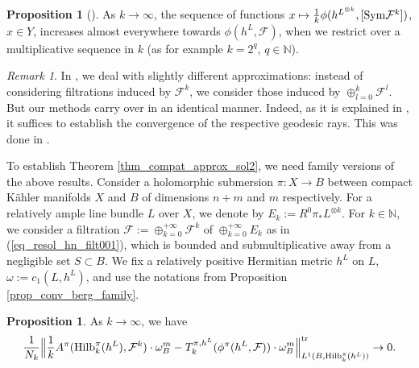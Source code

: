 \documentclass[12pt]{article}
\numberwithin{equation}{section}
\theoremstyle{theorem}
\theoremstyle{definition}
\newtheorem{prop}[thm]{Proposition}
\theoremstyle{remark}
\newtheorem{rem}[thm]{Remark}
\newcommand{\nat}{\mathbb{N}}
\begin{document}
	\begin{prop}[{\cite[(3.6)]{FinSubmToepl}}]\label{prop_incr_geod_rays}
		As $k \to \infty$, the sequence of functions $x \mapsto \frac{1}{k} \phi(h^{L^{\otimes k}}, [{\rm{Sym}} \mathcal{F}^k])$, $x \in Y$, increases almost everywhere towards $\phi(h^L, \mathcal{F})$, when we restrict over a multiplicative sequence in $k$ (as for example $k = 2^q$, $q \in \nat$).
	\end{prop}
	\begin{rem}
		In \cite{FinSubmToepl}, we deal with slightly different approximations: instead of considering filtrations induced by $\mathcal{F}^k$, we consider those induced by $\oplus_{l = 0}^{k} \mathcal{F}^l$.
		But our methods carry over in an identical manner.
		Indeed, as it is explained in \cite[(3.14)]{FinSubmToepl}, it suffices to establish the convergence of the respective geodesic rays.
		This was done in \cite[Theorem 5.10]{FinNarSim}.
	\end{rem}
	\par 
	To establish Theorem \ref{thm_compat_approx_sol2}, we need family versions of the above results.
	Consider a holomorphic submersion $\pi : X \to B$ between compact Kähler manifolds $X$ and $B$ of dimensions $n + m$ and $m$ respectively.
	For a relatively ample line bundle $L$ over $X$, we denote by $E_k := R^0 \pi_* L^{\otimes k}$.
	For $k \in \nat$, we consider a filtration $\mathcal{F} := \oplus_{k = 0}^{+\infty} \mathcal{F}^k$ of $\oplus_{k = 0}^{+\infty} E_k$ as in (\ref{eq_resol_hn_filt001}), which is bounded and submultiplicative away from a negligible set $S \subset B$.
	We fix a relatively positive Hermitian metric $h^L$ on $L$, $\omega := c_1(L, h^L)$, and use the notations from Proposition \ref{prop_conv_berg_family}.
	\begin{prop}\label{prop_toepl_schat_family}
		As $k \to \infty$, we have
		\begin{equation}
			\frac{1}{N_k}
			\Big\| 
				\frac{1}{k} A^{\pi}({\textrm{Hilb}}^{\pi}_k(h^L), \mathcal{F}^k) \cdot \omega_B^m
				-
				T^{\pi, h^L}_{k}(\phi^{\pi}(h^L, \mathcal{F}))  \cdot \omega_B^m
			\Big\|_{L^1(B, {\textrm{Hilb}}^{\pi}_k(h^L))}^{{\rm{tr}}}
			\to
			0.
		\end{equation}
	\end{prop}
\end{document}
